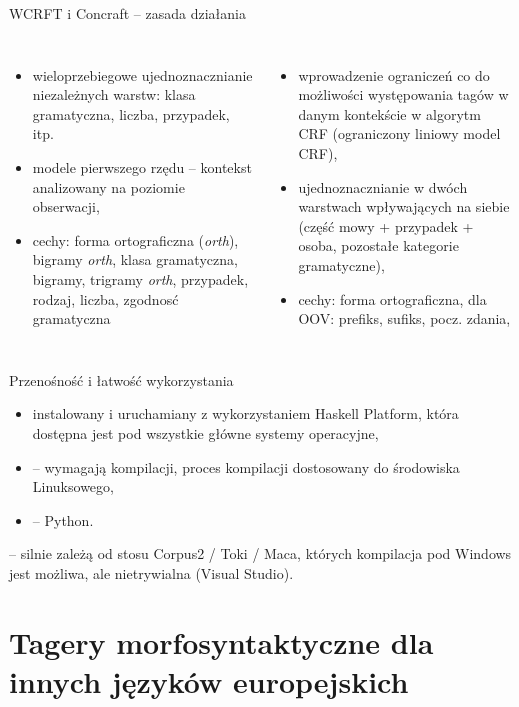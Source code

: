 \documentclass[xcolor=dvipsnames,polish]{beamer}
\begin{document}
\begin{frame}{WCRFT i Concraft -- zasada działania}
\begin{columns}[t]
  \begin{itemize}
    \item wieloprzebiegowe ujednoznacznianie niezależnych warstw: klasa gramatyczna, liczba, przypadek, itp.
    \item modele pierwszego rzędu -- kontekst analizowany na poziomie obserwacji,
    \item cechy: forma ortograficzna (\emph{orth}), bigramy \emph{orth}, klasa gramatyczna, bigramy, trigramy \emph{orth}, przypadek, rodzaj, liczba, zgodnosć gramatyczna
  \end{itemize}
  \begin{itemize}
    \item wprowadzenie ograniczeń co do możliwości występowania tagów w danym kontekście w algorytm CRF (ograniczony liniowy model CRF),
    \item ujednoznacznianie w dwóch warstwach wpływających na siebie (część mowy + przypadek + osoba, pozostałe kategorie gramatyczne),
    \item cechy: forma ortograficzna, dla OOV: prefiks, sufiks, pocz. zdania,
  \end{itemize}
\end{columns}
\end{frame}

\begin{frame}{Przenośność i łatwość wykorzystania}
  \begin{itemize}
    \item {} instalowany i uruchamiany z wykorzystaniem Haskell Platform, która dostępna jest pod wszystkie główne systemy operacyjne,
    \item {} -- wymagają kompilacji, proces kompilacji dostosowany do środowiska Linuksowego,
    \item {} -- Python.
  \end{itemize}
  \vspace{1cm}

   -- silnie zależą od stosu Corpus2 / Toki / Maca, których kompilacja pod Windows jest możliwa, ale nietrywialna (Visual Studio).
\end{frame}

\section{Tagery morfosyntaktyczne dla innych języków europejskich}
\frame{\sectionpage}
\end{document}
